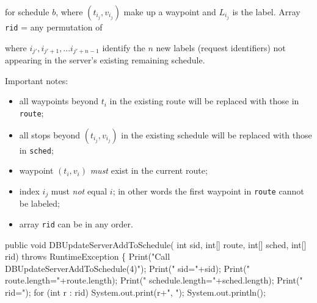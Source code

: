\documentclass{article}
\theoremstyle{definition}                   %
\begin{document}
\noindent for schedule $b$, where $(t_{i_j},v_{i_j})$ make up a waypoint and
$L_{i_j}$ is the label. Array {\tt{}rid} = any permutation of

\noindent
{}

\noindent where $i_{j'},i_{j'+1},...i_{j'+n-1}$ identify the $n$ new labels
(request identifiers) not appearing in the server's existing remaining
schedule.

Important notes:
\begin{itemize}
\item all waypoints beyond $t_i$ in the existing route will be replaced with
those in {\tt{}route};
\item all stops beyond $(t_{i_j},v_{i_j})$ in the existing schedule will be
replaced with those in {\tt{}sched};
\item waypoint $(t_i,v_i)$ \emph{must} exist in the current route;
\item index $i_j$ must \emph{not} equal $i$; in other words the first waypoint
in {\tt{}route} cannot be labeled;
\item array {\tt{}rid} can be in any order.
\end{itemize}
\nwenddocs{}\endmoddef{}
public void DBUpdateServerAddToSchedule(
    int sid, int[] route, int[] sched, int[] rid)
throws RuntimeException \{
  Print("Call DBUpdateServerAddToSchedule(4)");
  Print("  sid="+sid);
  Print("  route.length="+route.length);
  Print("  schedule.length="+sched.length);
  Print("  rid=");
  for (int r : rid)
    System.out.print(r+", ");
  System.out.println();
\end{document}
